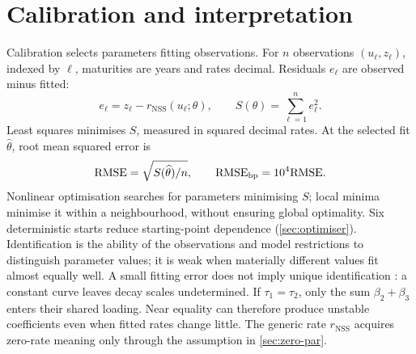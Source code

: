\section{Calibration and interpretation}\label{sec:calibration}
Calibration selects parameters fitting observations. For \(n\) observations \((u_\ell,z_\ell)\), indexed by \(\ell\), maturities are years and rates decimal. Residuals \(e_\ell\) are observed minus fitted:
\begin{equation}\label{eq:residuals}
e_\ell=z_\ell-r_{\mathrm{NSS}}(u_\ell;\theta),\qquad
S(\theta)=\sum_{\ell=1}^n e_\ell^2.
\end{equation}
Least squares minimises \(S\), measured in squared decimal rates. At the selected fit \(\widehat\theta\), root mean squared error is
\begin{equation}\label{eq:rmse}
\mathrm{RMSE}=\sqrt{S(\widehat\theta)/n},\qquad
\mathrm{RMSE}_{\mathrm{bp}}=10^4\mathrm{RMSE}.
\end{equation}
\label{sec:identification}
Nonlinear optimisation searches for parameters minimising \(S\); local minima minimise it within a neighbourhood, without ensuring global optimality. Six deterministic starts reduce starting-point dependence (\cref{sec:optimiser}). Identification is the ability of the observations and model restrictions to distinguish parameter values; it is weak when materially different values fit almost equally well. A small fitting error does not imply unique identification \parencite{gilli2010}: a constant curve leaves decay scales undetermined. If \(\tau_1=\tau_2\), only the sum \(\beta_2+\beta_3\) enters their shared loading. Near equality can therefore produce unstable coefficients even when fitted rates change little.
\label{sec:nss-meaning}
The generic rate \(r_{\mathrm{NSS}}\) acquires zero-rate meaning only through the assumption in \cref{sec:zero-par}.
